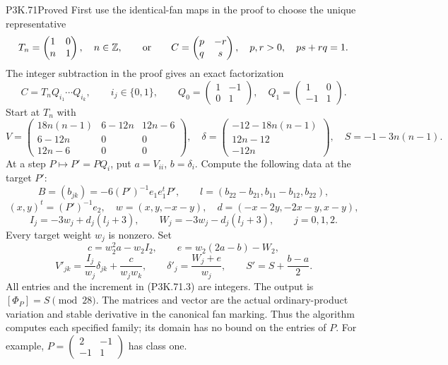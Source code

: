 \begin{statement}{P3K.71}{Proved}
First use the identical-fan maps in the proof to choose the unique
representative
\[
 T_n=\begin{pmatrix}1&0\\n&1\end{pmatrix},\quad n\in\mathbb Z,
 \qquad\hbox{or}\qquad
 C=\begin{pmatrix}p&-r\\q&s\end{pmatrix},\quad p,r>0,
 \quad ps+rq=1.
\]
The integer subtraction in the proof gives an exact factorization
\[
 C=T_nQ_{i_1}\cdots Q_{i_k},\qquad i_j\in\{0,1\},\qquad
 Q_0=\begin{pmatrix}1&-1\\0&1\end{pmatrix},\quad
 Q_1=\begin{pmatrix}1&0\\-1&1\end{pmatrix}.
\]
Start at \(T_n\) with
\[
 V=\begin{pmatrix}
 18n(n-1)&6-12n&12n-6\\
 6-12n&0&0\\12n-6&0&0
 \end{pmatrix},\quad
 \delta=\begin{pmatrix}-12-18n(n-1)\\12n-12\\-12n\end{pmatrix},
 \quad S=-1-3n(n-1).
 \tag{P3K.71.1}
\]
At a step \(P\mapsto P'=PQ_i\), put \(a=V_{ii}\),
\(b=\delta_i\). Compute the following data at the target \(P'\):
\[
 B=(b_{jk})=-6(P')^{-1}e_1e_1^tP',\qquad
 l=(b_{22}-b_{21},b_{11}-b_{12},b_{22}),
\]
\[
 (x,y)^t=(P')^{-1}e_2,\quad
 w=(x,y,-x-y),\quad d=(-x-2y,-2x-y,x-y),
\]
\[
 I_j=-3w_j+d_j(l_j+3),\qquad
 W_j=-3w_j-d_j(l_j+3),\qquad j=0,1,2.
 \tag{P3K.71.2}
\]
Every target weight \(w_j\) is nonzero. Set
\[
 c=w_2^2a-w_2I_2,\qquad e=w_2(2a-b)-W_2,
\]
\[
 V'_{jk}=\frac{I_j}{w_j}\delta_{jk}+\frac{c}{w_jw_k},\qquad
 \delta'_j=\frac{W_j+e}{w_j},\qquad
 S'=S+\frac{b-a}{2}.                                  \tag{P3K.71.3}
\]
All entries and the increment in (P3K.71.3) are integers. The
output is \([\Phi_P]=S\pmod{28}\). The matrices and vector are
the actual ordinary-product variation and stable derivative in
the canonical fan marking. Thus the algorithm computes each
specified family; its domain has no bound on the entries of \(P\).
For example, \(P=(\begin{smallmatrix}2&-1\\-1&1\end{smallmatrix})\)
has class one.
\end{statement}
